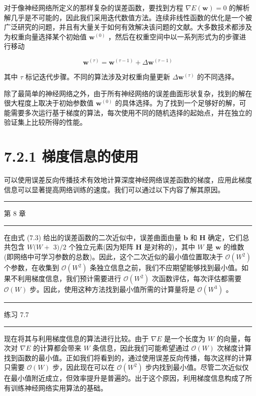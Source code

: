 \documentclass[10pt]{article}
\newcommand{\HRule}{\begin{center}\rule{0.9\linewidth}{0.2mm}\end{center}}
\begin{document}
对于像神经网络所定义的那样复杂的误差函数，要找到方程 \(\nabla E\left( \mathbf{w}\right)  = 0\) 的解析解几乎是不可能的，因此我们采用迭代数值方法。连续非线性函数的优化是一个被广泛研究的问题，并且有大量关于如何有效解决该问题的文献。大多数技术都涉及为权重向量选择某个初始值 \({\mathbf{w}}^{\left( 0\right) }\) ，然后在权重空间中以一系列形式为的步骤进行移动

\[
{\mathbf{w}}^{\left( \tau \right) } = {\mathbf{w}}^{\left( \tau  - 1\right) } + \Delta {\mathbf{w}}^{\left( \tau  - 1\right) } \tag{7.15}
\]

其中 \(\tau\) 标记迭代步骤。不同的算法涉及对权重向量更新 \(\Delta {\mathbf{w}}^{\left( \tau \right) }\) 的不同选择。

除了最简单的神经网络之外，由于所有神经网络的误差曲面形状复杂，找到的解在很大程度上取决于初始参数值 \({\mathbf{w}}^{\left( 0\right) }\) 的具体选择。为了找到一个足够好的解，可能需要多次运行基于梯度的算法，每次使用不同的随机选择的起始点，并在独立的验证集上比较所得的性能。

\section*{7.2.1 梯度信息的使用}

可以使用误差反向传播技术有效地计算深度神经网络误差函数的梯度，应用此梯度信息可以显著提高网络训练的速度。我们可以通过以下内容了解其原因。

\HRule

第 8 章

\HRule

在由式 (7.3) 给出的误差函数的二次近似中，误差曲面由量 \(\mathbf{b}\) 和 \(\mathbf{H}\) 确定，它们总共包含 \(W(W +\)  \(3)/2\) 个独立元素(因为矩阵 \(\mathbf{H}\) 是对称的)，其中 \(W\) 是 \(\mathbf{w}\) 的维数(即网络中可学习参数的总数)。因此，这个二次近似的最小值位置取决于 \(\mathcal{O}\left( {W}^{2}\right)\) 个参数，在收集到 \(\mathcal{O}\left( {W}^{2}\right)\) 条独立信息之前，我们不应期望能够找到最小值。如果不利用梯度信息，我们预计需要进行 \(\mathcal{O}\left( {W}^{2}\right)\) 次函数评估，每次评估都需要 \(\mathcal{O}\left( W\right)\) 步。因此，使用这种方法找到最小值所需的计算量将是 \(\mathcal{O}\left( {W}^{3}\right)\) 。

\HRule

练习 7.7

\HRule

现在将其与利用梯度信息的算法进行比较。由于 \(\nabla E\) 是一个长度为 \(W\) 的向量，每次对 \(\nabla E\) 的计算都会带来 \(W\) 条信息，因此我们可能希望通过 \(\mathcal{O}\left( W\right)\) 次梯度计算找到函数的最小值。正如我们将看到的，通过使用误差反向传播，每次这样的计算只需要 \(\mathcal{O}\left( W\right)\) 步，因此现在可以在 \(\mathcal{O}\left( {W}^{2}\right)\) 步内找到最小值。尽管二次近似仅在最小值附近成立，但效率提升是普遍的。出于这个原因，利用梯度信息构成了所有训练神经网络实用算法的基础。
\end{document}
